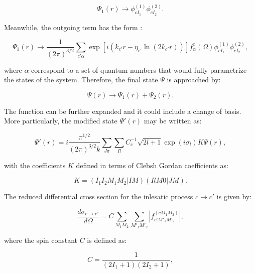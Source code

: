 \documentclass[openany]{book}
\begin{document}
 \begin{equation}\label{rmatrix_channels_incomingCoulomb}
 	\Psi_1(r) \rightarrow \phi^{(1)}_{cI_1} \phi^{(2)}_{cI_2}.
 \end{equation}

Meanwhile, the outgoing term has the form :


\begin{equation}\label{rmatrix_channels_outgoing}
	\Psi_1(r) \rightarrow \frac{1}{(2\pi)^{3/2}} \sum_{c' \alpha} \exp {[i(k_{c'}r - \eta_{c'} \ln {(2k_{c'}r )})]} f^{c}_{\alpha}(\Omega)  \phi^{(1)}_{cI_1} \phi^{(2)}_{cI_2},
\end{equation}

where $\alpha$ correspond to a set of quantum numbers that would fully parametrize the states of the system. Therefore, the final state $\Psi$ is approached by: 

\begin{equation}\label{rmatrix_channels_state_final}
	\Psi(r) \rightarrow \Psi_1(r) + \Psi_2(r).
\end{equation}

The function can be further expanded and it could include a change of basis. More particularly, the modified state $	\Psi'(r)$ may be written as:

\begin{equation}\label{rmatrix_channels_state_final_change}
	\Psi'(r) = i \frac{\pi^{1/2}}{(2\pi)^{3/2} k} \sum_{J\pi} \sum_{Il} C^{-1}_c \sqrt{2l + 1} \exp (i\sigma_l) K \Psi(r),
\end{equation}

with the coefficients $K$ defined in terms of Clebsh Gordan coefficients as: 

\begin{equation}\label{rmatrix_channels_state_final_clebshGordan}
	K = (I_1 I_2 M_1 M_2 | IM)(IlM0 | JM).
\end{equation}


The reduced differential cross section for the inlesatic process $c\rightarrow c'$ is given by:

\begin{equation}\label{rmatrix_difcrossSection_ccprime}
	\frac{d\sigma_{c\rightarrow c'}}{d\Omega} = C \sum_{M_1M_2} \sum_{M'_1M'_2} |f^{(c M_1 M_2)}_{c' M'_1 M'_2}|,
\end{equation}

where the spin constant $C$ is defined as:

\begin{equation}\label{rmatrix_difcrossSection_spinConstant}
	C = \frac{1}{(2I_1 + 1)(2I_2 + 1)},
\end{equation}
\end{document}
